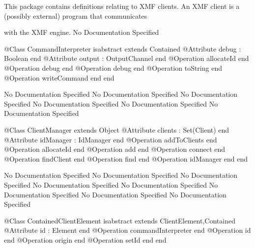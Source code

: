        This package contains definitions relating to XMF clients.
       An XMF client is a (possibly external) program that communicates

       with the XMF engine.
No Documentation Specified
\begin{Interface}
@Class CommandInterpreter isabstract extends Contained
  @Attribute debug : Boolean end
  @Attribute output : OutputChannel end
  @Operation allocateId end
  @Operation debug end
  @Operation debug end
  @Operation toString end
  @Operation writeCommand end
end
\end{Interface}
No Documentation Specified
No Documentation Specified
No Documentation Specified
No Documentation Specified
No Documentation Specified
No Documentation Specified
\begin{Interface}
@Class ClientManager extends Object
  @Attribute clients : Set(Client) end
  @Attribute idManager : IdManager end
  @Operation addToClients end
  @Operation allocateId end
  @Operation add end
  @Operation connect end
  @Operation findClient end
  @Operation find end
  @Operation idManager end
end
\end{Interface}
No Documentation Specified
No Documentation Specified
No Documentation Specified
No Documentation Specified
No Documentation Specified
No Documentation Specified
No Documentation Specified
No Documentation Specified
\begin{Interface}
@Class ContainedClientElement isabstract extends ClientElement,Contained
  @Attribute id : Element end
  @Operation commandInterpreter end
  @Operation id end
  @Operation origin end
  @Operation setId end
end
\end{Interface}
